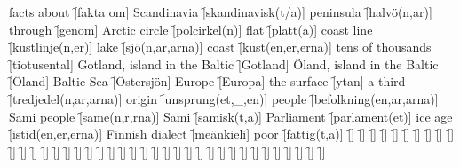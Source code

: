 \begin{questions}
    \begin{multicols}{2}
        \raggedcolumns
        \question facts about \f[fakta om]
        \question Scandinavia \f[skandinavisk(t/a)]
        \question peninsula \f[halvö(n,ar)]
        \question through \f[genom]
        \question Arctic circle \f[polcirkel(n)]
        \question flat \f[platt(a)]
        \question coast line \f[kustlinje(n,er)]
        \question lake \f[sjö(n,ar,arna)]
        \question coast \f[kust(en,er,erna)]
        \question tens of thousands \f[tiotusental]
        \question Gotland, island in the Baltic \f[Gotland]
        \question Öland, island in the Baltic \f[Öland]
        \question Baltic Sea \f[Östersjön]
        \question Europe \f[Europa]
        \question the surface \f[ytan]
        \question a third \f[tredjedel(n,ar,arna)]
        \question origin \f[unsprung(et,\_,en)]
        \question people \f[befolkning(en,ar,arna)]
        \question Sami people \f[same(n,r,rna)]
        \question Sami \f[samisk(t,a)]
        \question Parliament \f[parlament(et)]
        \question ice age \f[istid(en,er,erna)]
        \question Finnish dialect \f[meänkieli]
        \question poor \f[fattig(t,a)]
        \question  \f[]
        \question  \f[]
        \question  \f[]
        \question  \f[]
        \question  \f[]
        \question  \f[]
        \question  \f[]
        \question  \f[]
        \question  \f[]
        \question  \f[]
        \question  \f[]
        \question  \f[]
        \question  \f[]
        \question  \f[]
        \question  \f[]
        \question  \f[]
        \question  \f[]
        \question  \f[]
        \question  \f[]
        \question  \f[]
        \question  \f[]
        \question  \f[]
        \question  \f[]
        \question  \f[]
        \question  \f[]
        \question  \f[]
        \question  \f[]
        \question  \f[]
        \question  \f[]
        \question  \f[]
        \question  \f[]
        \question  \f[]
        \question  \f[]
        \question  \f[]
        \question  \f[]
        \question  \f[]
        \question  \f[]
        \question  \f[]
        \question  \f[]
    \end{multicols}
\end{questions}

